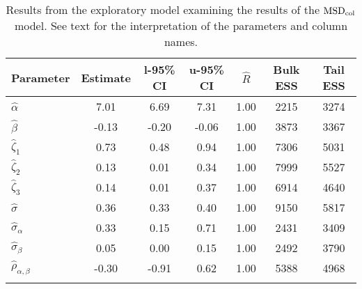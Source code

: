 \begin{table}
\caption{Results from the exploratory model examining the results of the $\operatorname{MSD}_{\text{col}}$ model. \label{tab:the exploratory-MSDobs}See text for the interpretation of the parameters and column names.}

\begin{tabular}{l *3{S[table-format=-1.2]} S[table-format=1.2] *2{S[table-format=5.0]}}
\lsptoprule
Parameter & {Estimate} & {l-95\% CI} & {u-95\% CI} & {$\hat{R}$} & {Bulk ESS} & {Tail ESS}\\
\midrule
$\hat\alpha$ & 7.01 & 6.69 & 7.31 & 1.00 & 2215 & 3274\\
$\hat\beta$ & -0.13 & -0.20 & -0.06 & 1.00 & 3873 & 3367\\
$\hat\zeta_{1}$ & 0.73 & 0.48 & 0.94 & 1.00 & 7306 & 5031\\
$\hat\zeta_{2}$ & 0.13 & 0.01 & 0.34 & 1.00 & 7999 & 5527\\
$\hat\zeta_{3}$ & 0.14 & 0.01 & 0.37 & 1.00 & 6914 & 4640\\
$\hat\sigma$ & 0.36 & 0.33 & 0.40 & 1.00 & 9150 & 5817\\
$\hat\sigma_{\alpha}$ & 0.33 & 0.15 & 0.71 & 1.00 & 2431 & 3409\\
$\hat\sigma_{\beta}$ & 0.05 & 0.00 & 0.15 & 1.00 & 2492 & 3790\\
$\hat\rho_{\alpha,\beta}$ & -0.30 & -0.91 & 0.62 & 1.00 & 5388 & 4968\\
\lspbottomrule
\end{tabular}
\end{table}






